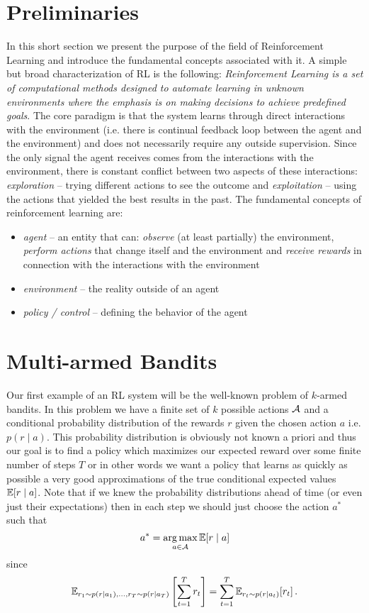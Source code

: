 \documentclass{myclass}
\begin{document}
\section{Preliminaries}

In this short section we present the purpose of the field of Reinforcement Learning and introduce
the fundamental concepts associated with it. A simple but broad characterization of RL is the
following: \emph{Reinforcement Learning is a set of computational methods designed to automate
learning in unknown environments where the emphasis is on making decisions to achieve predefined
goals}. The core paradigm is that the system learns through direct interactions with the environment
(i.e. there is continual feedback loop between the agent and the environment) and does not
necessarily require any outside supervision. Since the only signal the agent receives comes from the
interactions with the environment, there is constant conflict between two aspects of these
interactions: \emph{exploration} -- trying different actions to see the outcome and
\emph{exploitation} -- using the actions that yielded the best results in the past. The fundamental
concepts of reinforcement learning are:
\begin{itemize}

    \item \emph{agent} -- an entity that can: \emph{observe} (at least partially) the environment,
    \emph{perform actions} that change itself and the environment and \emph{receive rewards} in
    connection with the interactions with the environment

    \item \emph{environment} -- the reality outside of an agent

    \item \emph{policy / control} -- defining the behavior of the agent

\end{itemize}


\section{Multi-armed Bandits}

Our first example of an RL system will be the well-known problem of $k$-armed bandits. In this
problem we have a finite set of $k$ possible actions $\mathcal{A}$ and a conditional probability
distribution of the rewards $r$ given the chosen action $a$ i.e. $p(r \mid a)$. This probability
distribution is obviously not known a priori and thus our goal is to find a policy which maximizes
our expected reward over some finite number of steps $T$ or in other words we want a policy that
learns as quickly as possible a very good approximations of the true conditional expected values
$\mathbb{E}[r \mid a]$. Note that if we knew the probability distributions ahead of time (or even just
their expectations) then in each step we should just choose the action $a^*$ such that
\[
    a^* = \operatorname*{arg\,max}_{a \in \mathcal{A}} \mathbb{E}[r \mid a]
\]
since
\[
    \mathbb{E}_{r_1 \sim p(r \mid a_1), \ldots, r_T \sim p(r \mid a_T)} \left[ \sum_{t=1}^T r_t \right] = \sum_{t=1}^T \mathbb{E}_{r_t \sim p(r \mid a_t)} [r_t]\,.
\]
\end{document}

